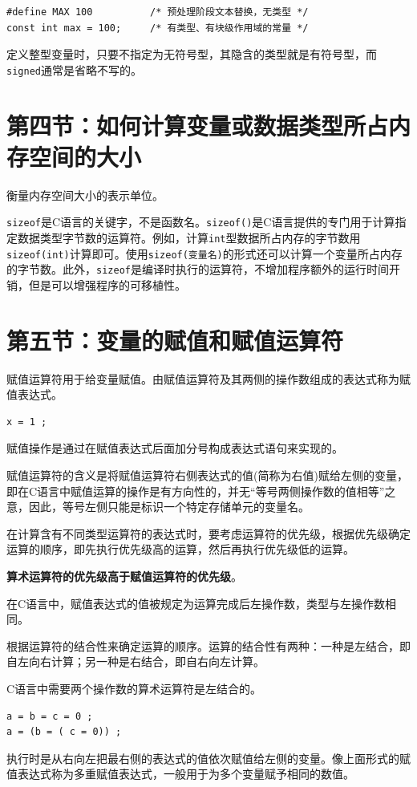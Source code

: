 \begin{lstlisting}
#define MAX 100          /* 预处理阶段文本替换，无类型 */
const int max = 100;     /* 有类型、有块级作用域的常量 */
\end{lstlisting}

定义整型变量时，只要不指定为无符号型，其隐含的类型就是有符号型，而\texttt{signed}通常是省略不写的。


\section{第四节：如何计算变量或数据类型所占内存空间的大小}
衡量内存空间大小的表示单位。

\texttt{sizeof}是C语言的关键字，不是函数名。\texttt{sizeof()}是C语言提供的专门用于计算指定数据类型字节数的运算符。例如，计算\texttt{int}型数据所占内存的字节数用\texttt{sizeof(int)}计算即可。使用\texttt{sizeof(变量名)}的形式还可以计算一个变量所占内存的字节数。此外，\texttt{sizeof}是编译时执行的运算符，不增加程序额外的运行时间开销，但是可以增强程序的可移植性。


\section{第五节：变量的赋值和赋值运算符}
赋值运算符用于给变量赋值。由赋值运算符及其两侧的操作数组成的表达式称为赋值表达式。

\begin{lstlisting}
x = 1 ;
\end{lstlisting}

赋值操作是通过在赋值表达式后面加分号构成表达式语句来实现的。

赋值运算符的含义是将赋值运算符右侧表达式的值(简称为右值)赋给左侧的变量，即在C语言中赋值运算的操作是有方向性的，并无“等号两侧操作数的值相等”之意，因此，等号左侧只能是标识一个特定存储单元的变量名。

在计算含有不同类型运算符的表达式时，要考虑运算符的优先级，根据优先级确定运算的顺序，即先执行优先级高的运算，然后再执行优先级低的运算。

\textbf{算术运算符的优先级高于赋值运算符的优先级}。

在C语言中，赋值表达式的值被规定为运算完成后左操作数，类型与左操作数相同。

根据运算符的结合性来确定运算的顺序。运算的结合性有两种：一种是左结合，即自左向右计算；另一种是右结合，即自右向左计算。

C语言中需要两个操作数的算术运算符是左结合的。

\begin{lstlisting}
a = b = c = 0 ;
a = (b = ( c = 0)) ;
\end{lstlisting}

执行时是从右向左把最右侧的表达式的值依次赋值给左侧的变量。像上面形式的赋值表达式称为多重赋值表达式，一般用于为多个变量赋予相同的数值。

